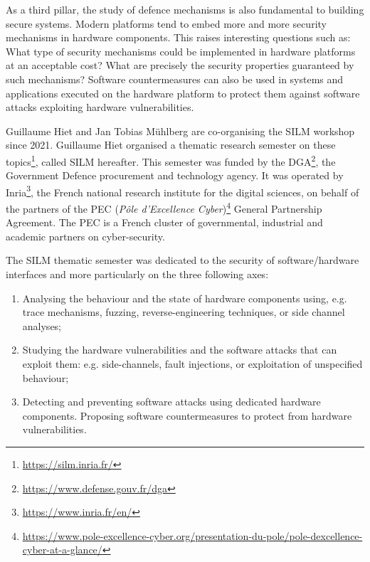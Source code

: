 \documentclass[a4paper,11pt]{article}
\begin{document}
As a third pillar, the study of defence mechanisms is also fundamental to
building secure systems. Modern platforms tend to embed more and more
security mechanisms in hardware components. This raises interesting
questions such as: What type of security mechanisms could be implemented in
hardware platforms at an acceptable cost? What are precisely the security
properties guaranteed by such mechanisms? Software countermeasures can also
be used in systems and applications executed on the hardware platform to
protect them against software attacks exploiting hardware vulnerabilities.

Guillaume Hiet and Jan Tobias M\"uhlberg are co-organising the SILM
workshop since 2021.
Guillaume Hiet organised a thematic
research semester on these topics\footnote{\url{https://silm.inria.fr/}},
called SILM hereafter. This semester was funded by the
DGA\footnote{\url{https://www.defense.gouv.fr/dga}}, the Government Defence
procurement and technology agency. It was  operated by
Inria\footnote{\url{https://www.inria.fr/en/}}, the French national
research institute for the digital sciences, on behalf of the partners of
the PEC (\textit{Pôle d'Excellence
Cyber})\footnote{\url{https://www.pole-excellence-cyber.org/presentation-du-pole/pole-dexcellence-cyber-at-a-glance/}}
General Partnership Agreement. The PEC is a French cluster of governmental,
industrial and academic partners on cyber-security.

The SILM thematic semester was dedicated to the security of
software/hardware interfaces and more particularly on the three
following axes:

\begin{enumerate}
%
    \item Analysing the behaviour and the state of hardware components
using, e.g. trace mechanisms, fuzzing, reverse-engineering techniques, or
side channel analyses;
%
    \item Studying the hardware vulnerabilities and the software attacks
that can exploit them: e.g. side-channels, fault injections, or
exploitation of unspecified behaviour;
%
    \item Detecting and preventing software attacks using dedicated
hardware components. Proposing software countermeasures to protect from
hardware vulnerabilities.
%
\end{enumerate}
\end{document}
